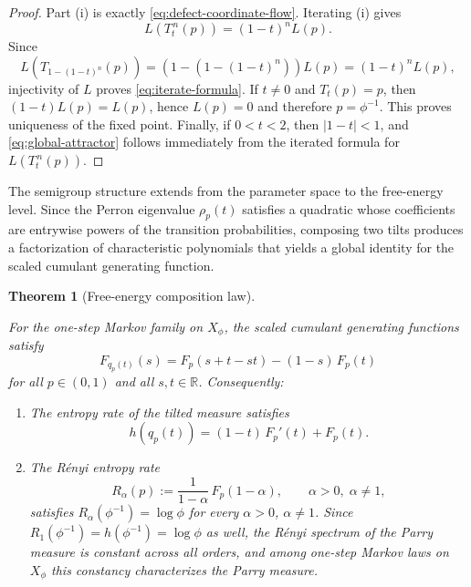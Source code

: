 \documentclass[pdflatex,sn-basic,Numbered]{sn-jnl}
\theoremstyle{thmstyleone}
\newtheorem{theorem}{Theorem}[section]
\theoremstyle{thmstyletwo}
\theoremstyle{thmstylethree}
\newcommand{\RR}{\mathbb{R}}
\newcommand{\leanverified}[1]{}
\begin{document}
\begin{proof}
Part (i) is exactly \eqref{eq:defect-coordinate-flow}. Iterating (i) gives
\[
L(T_t^{\,n}(p))=(1-t)^nL(p).
\]
Since
\[
L(T_{1-(1-t)^n}(p))=(1-(1-(1-t)^n))L(p)=(1-t)^nL(p),
\]
injectivity of $L$ proves \eqref{eq:iterate-formula}. If $t\neq 0$ and $T_t(p)=p$, then $(1-t)L(p)=L(p)$, hence $L(p)=0$ and therefore $p=\phi^{-1}$. This proves uniqueness of the fixed point. Finally, if $0<t<2$, then $|1-t|<1$, and \eqref{eq:global-attractor} follows immediately from the iterated formula for $L(T_t^{\,n}(p))$.
\end{proof}

The semigroup structure extends from the parameter space to the free-energy level. Since the Perron eigenvalue $\rho_p(t)$ satisfies a quadratic whose coefficients are entrywise powers of the transition probabilities, composing two tilts produces a factorization of characteristic polynomials that yields a global identity for the scaled cumulant generating function.

\begin{theorem}[Free-energy composition law]\label{thm:composition}
\leanverified{paper_zero_jitter_free_energy_composition}
For the one-step Markov family on $X_\phi$, the scaled cumulant generating functions satisfy
\begin{equation}\label{eq:composition}
F_{q_p(t)}(s) = F_p(s+t-st) - (1-s)\,F_p(t)
\end{equation}
for all $p\in(0,1)$ and all $s,t\in\RR$. Consequently:
\begin{enumerate}[label=(\roman*),leftmargin=*,itemsep=2pt]
  \item The entropy rate of the tilted measure satisfies
  \begin{equation}\label{eq:entropy-composition}
  h(q_p(t)) = (1-t)\,F_p'(t) + F_p(t).
  \end{equation}
  \item The R\'enyi entropy rate
  \[
  R_\alpha(p):=\frac{1}{1-\alpha}\,F_p(1-\alpha), \qquad \alpha>0,\;\alpha\neq 1,
  \]
  satisfies $R_\alpha(\phi^{-1})=\log\phi$ for every $\alpha>0$, $\alpha\neq 1$. Since $R_1(\phi^{-1})=h(\phi^{-1})=\log\phi$ as well, the R\'enyi spectrum of the Parry measure is constant across all orders, and among one-step Markov laws on~$X_\phi$ this constancy characterizes the Parry measure.
\end{enumerate}
\end{theorem}
\end{document}
